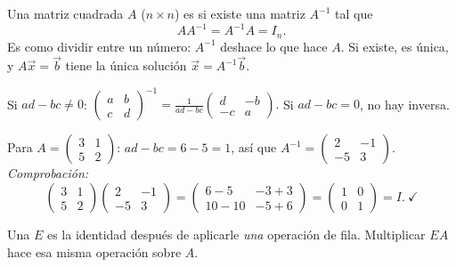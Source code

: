 \documentclass[11pt,a4paper]{article}
\begin{document}
\begin{definicion}
Una matriz cuadrada $A$ ($n\times n$) es  si existe una matriz $A^{-1}$ tal que
\[ AA^{-1}=A^{-1}A=I_n. \]
Es como dividir entre un número: $A^{-1}$ deshace lo que hace $A$. Si existe, es única, y $A\vec x=\vec b$ tiene la
única solución $\vec x=A^{-1}\vec b$.
\end{definicion}

\begin{propiedad}
Si $ad-bc\neq0$:\qquad
$\displaystyle \begin{pmatrix} a & b\\ c & d \end{pmatrix}^{-1}=\frac{1}{ad-bc}\begin{pmatrix} d & -b\\ -c & a \end{pmatrix}.$
\quad Si $ad-bc=0$, no hay inversa.
\end{propiedad}

\begin{ejemplo}
Para $A=\begin{pmatrix} 3 & 1\\ 5 & 2 \end{pmatrix}$: $ad-bc=6-5=1$, así que
$A^{-1}=\begin{pmatrix} 2 & -1\\ -5 & 3 \end{pmatrix}$. \emph{Comprobación:}
\[ \begin{pmatrix} 3 & 1\\ 5 & 2 \end{pmatrix}\begin{pmatrix} 2 & -1\\ -5 & 3 \end{pmatrix}
=\begin{pmatrix} 6-5 & -3+3\\ 10-10 & -5+6 \end{pmatrix}=\begin{pmatrix} 1 & 0\\ 0 & 1 \end{pmatrix}=I.\ \checkmark \]
\end{ejemplo}

\begin{definicion}
Una  $E$ es la identidad después de aplicarle \emph{una} operación de fila.
Multiplicar $EA$ hace esa misma operación sobre $A$.
\end{definicion}
\end{document}
